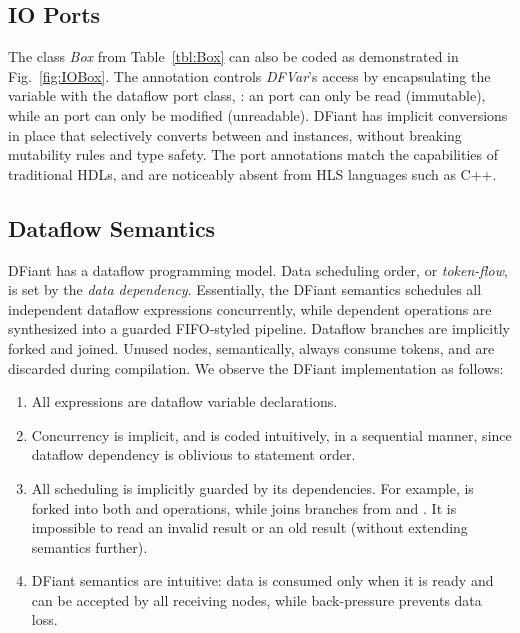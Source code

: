 %

\subsection{IO Ports}
\label{sec:io_ports}
The class \textit{Box} from Table~\ref{tbl:Box} can also be coded as demonstrated in Fig.~\ref{fig:IOBox}. The annotation  controls \textit{DFVar}'s access by encapsulating the variable with the dataflow port class, : an  port can only be read (immutable), while an  port can only be modified (unreadable). DFiant has implicit conversions in place that selectively converts between  and  instances, without breaking mutability rules and type safety. The port annotations match the capabilities of traditional HDLs, and are noticeably absent from HLS languages such as C++. 



\subsection{Dataflow Semantics}
DFiant has a dataflow programming model. Data scheduling order, or \textit{token-flow}, is set by the \textit{data dependency}. Essentially, the DFiant semantics schedules all independent dataflow expressions concurrently, while dependent operations are synthesized into a guarded FIFO-styled pipeline. Dataflow branches are implicitly forked and joined. Unused nodes, semantically, always consume tokens, and are discarded during compilation. We observe the DFiant  implementation as follows:

\begin{enumerate}
  \item All expressions are dataflow variable declarations.
  \item Concurrency is implicit, and  is coded intuitively, in a sequential manner, since dataflow dependency is oblivious to statement order. 
  \item All scheduling is implicitly guarded by its dependencies. For example,  is forked into both  and  operations, while  joins branches from  and .
  It is impossible to read an invalid result or an old result (without extending semantics further).
  \item DFiant semantics are intuitive: data is consumed only when it is ready and can be accepted by all receiving nodes, while back-pressure prevents data loss. 
\end{enumerate} 

